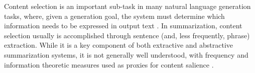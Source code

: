 




Content selection is an important sub-task in many natural language generation
tasks,
where, given a generation goal, the system must determine which information
needs to be expressed in output text \cite{gatt2018survey}.
In summarization, content selection usually is accomplished through sentence (and,
less frequently, phrase) extraction.
 While it is a key component of both
extractive and abstractive summarization systems, it is not generally well 
understood,  with frequency and information theoretic measures used as proxies
for content salience \cite{hong2014improving}. 

